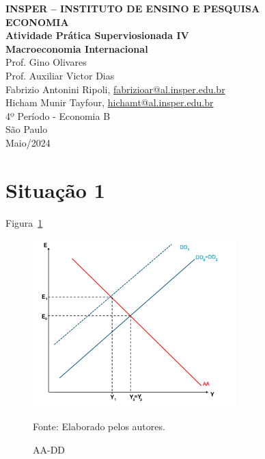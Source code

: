 \documentclass[a4paper,12pt]{article}[abntex2]
\begin{document}
\begin{titlepage}
    \centering
    \vspace*{1cm}
    \Large\textbf{INSPER – INSTITUTO DE ENSINO E PESQUISA}\\
    \Large \textbf{ECONOMIA}\\
    \vspace{1.5cm}
    \Large\textbf{Atividade Prática Superviosionada IV}\\
    \textbf{Macroeconomia Internacional}\\
    \vspace{1.5cm}
    Prof. Gino Olivares\\
    Prof. Auxiliar Victor Dias \\
    \vfill
    \normalsize
    Fabrizio Antonini Ripoli, \href{mailto:fabrizioar@al.insper.edu.br}{fabrizioar@al.insper.edu.br}\\
    Hicham Munir Tayfour, \href{mailto:hichamt@al.insper.edu.br}{hichamt@al.insper.edu.br}\\
    4º Período - Economia B\\
    \vfill
    São Paulo\\
    Maio/2024
\end{titlepage}

\newpage
\tableofcontents
\thispagestyle{empty} %
\newpage
\setcounter{page}{1} %
\justify
\onehalfspacing

\pagestyle{fancy}
\fancyhf{}
\rhead{\thepage}

\section{\textbf{Situação 1}}

Figura~\ref{fig:AADD La}

\begin{figure}[H]
    \centering
    \caption{AA-DD} 
    \includegraphics[width=0.7\textwidth]{4º Período/Macroeconomia Internacional/APS 4 Macro Int/AA-DD L(a).png}
    \label{fig:AADD La}
    
    \footnotesize{Fonte: Elaborado pelos autores.}
    \end{figure}
\end{document}
